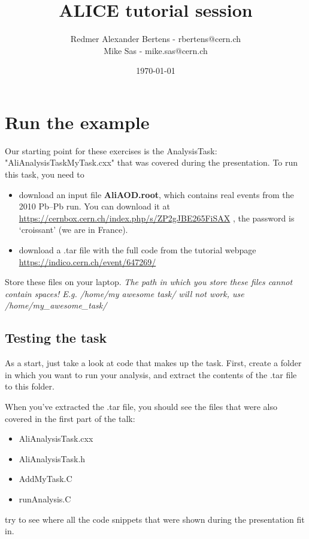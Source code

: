 \documentclass{article}
\title{ALICE tutorial session}
\author{ Redmer Alexander Bertens - rbertens@cern.ch \\ Mike Sas - mike.sas@cern.ch }
\date{\today}
\begin{document}
\maketitle

\section{Run the example}

Our starting point for these exercises is the AnalysisTask: "AliAnalysisTaskMyTask.cxx" that was covered during the presentation. To run this task, you need to
\begin{itemize}
    \item download an input file \textbf{AliAOD.root}, which contains real events from the 2010 Pb--Pb run. You can download it at
\href{https://cernbox.cern.ch/index.php/s/ZP2gJBE265FiSAX}{https://cernbox.cern.ch/index.php/s/ZP2gJBE265FiSAX} , the password is `croissant' (we are in France). 
\item download a .tar file with the full code from the tutorial webpage \href{https://indico.cern.ch/event/647269/}{https://indico.cern.ch/event/647269/}
    \end{itemize}
    Store these files on your laptop. \emph{The path in which you store these files cannot contain spaces! E.g. /home/my awesome task/ will not work, use /home/my\_awesome\_task/}


\subsection{Testing the task}

As a start, just take a look at code that makes up the task. First, create a folder in which you want to run your analysis, and extract the contents of the .tar file to this folder. 


When you've extracted the .tar file, you should see the files that were also covered in the first part of the talk:

\begin{itemize}
\item AliAnalysisTask.cxx
\item AliAnalysisTask.h
\item AddMyTask.C
\item runAnalysis.C
\end{itemize}

try to see where all the code snippets that were shown during the presentation fit in. 
\end{document}
